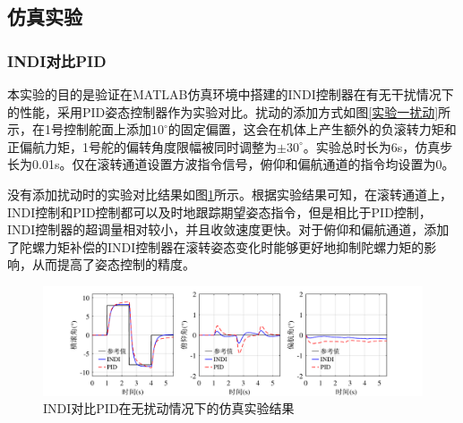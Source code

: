 \subsection{仿真实验}

\subsubsection{INDI对比PID}

本实验的目的是验证在MATLAB仿真环境中搭建的INDI控制器在有无干扰情况下的性能，采用PID姿态控制器作为实验对比。扰动的添加方式如图\ref{实验一扰动}所示，在1号控制舵面上添加$10^{\circ}$的固定偏置，这会在机体上产生额外的负滚转力矩和正偏航力矩，1号舵的偏转角度限幅被同时调整为$\pm30^{\circ}$。实验总时长为6s，仿真步长为0.01s。仅在滚转通道设置方波指令信号，俯仰和偏航通道的指令均设置为0。

没有添加扰动时的实验对比结果如图\ref{INDI对比PID仿真无扰动}所示。根据实验结果可知，在滚转通道上，INDI控制和PID控制都可以及时地跟踪期望姿态指令，但是相比于PID控制，INDI控制器的超调量相对较小，并且收敛速度更快。对于俯仰和偏航通道，添加了陀螺力矩补偿的INDI控制器在滚转姿态变化时能够更好地抑制陀螺力矩的影响，从而提高了姿态控制的精度。
\begin{figure}[htbp]
	\centering
	\begin{minipage}[c]{1\textwidth}
        \centering
        \includegraphics[scale=1]{Fig/INDI对比PID无扰动仿真实验结果.pdf}
        \caption{\label{INDI对比PID仿真无扰动}INDI对比PID在无扰动情况下的仿真实验结果}
        \end{minipage}
\end{figure}

